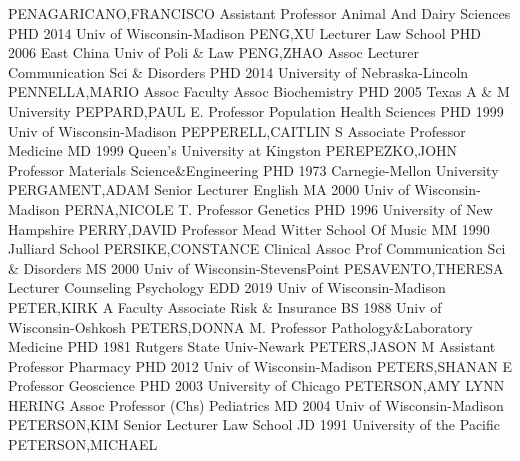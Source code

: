 \documentclass[
]{article}
\begin{document}
\textbar PENAGARICANO,FRANCISCO \textbar Assistant Professor
\textbar Animal And Dairy Sciences \textbar PHD 2014 Univ of
Wisconsin-Madison \textbar{}  \textbar PENG,XU
\textbar Lecturer \textbar Law School \textbar PHD 2006 East China Univ
of Poli \& Law \textbar{}  \textbar PENG,ZHAO \textbar Assoc
Lecturer \textbar Communication Sci \& Disorders \textbar PHD 2014
University of Nebraska-Lincoln \textbar{} 
\textbar PENNELLA,MARIO \textbar Assoc Faculty Assoc
\textbar Biochemistry \textbar PHD 2005 Texas A \& M University
\textbar{}  \textbar PEPPARD,PAUL E. \textbar Professor
\textbar Population Health Sciences \textbar PHD 1999 Univ of
Wisconsin-Madison \textbar{}  \textbar PEPPERELL,CAITLIN S
\textbar Associate Professor \textbar Medicine \textbar MD 1999 Queen's
University at Kingston \textbar{}  \textbar PEREPEZKO,JOHN
\textbar Professor \textbar Materials Science\&Engineering \textbar PHD
1973 Carnegie-Mellon University \textbar{} 
\textbar PERGAMENT,ADAM \textbar Senior Lecturer \textbar English
\textbar MA 2000 Univ of Wisconsin-Madison \textbar{} 
\textbar PERNA,NICOLE T. \textbar Professor \textbar Genetics
\textbar PHD 1996 University of New Hampshire \textbar{} 
\textbar PERRY,DAVID \textbar Professor \textbar Mead Witter School Of
Music \textbar MM 1990 Julliard School \textbar{} 
\textbar PERSIKE,CONSTANCE \textbar Clinical Assoc Prof
\textbar Communication Sci \& Disorders \textbar MS 2000 Univ of
Wisconsin-StevensPoint \textbar{} 
\textbar PESAVENTO,THERESA \textbar Lecturer \textbar Counseling
Psychology \textbar EDD 2019 Univ of Wisconsin-Madison \textbar{}
 \textbar PETER,KIRK A \textbar Faculty Associate
\textbar Risk \& Insurance \textbar BS 1988 Univ of Wisconsin-Oshkosh
\textbar{}  \textbar PETERS,DONNA M. \textbar Professor
\textbar Pathology\&Laboratory Medicine \textbar PHD 1981 Rutgers State
Univ-Newark \textbar{}  \textbar PETERS,JASON M
\textbar Assistant Professor \textbar Pharmacy \textbar PHD 2012 Univ of
Wisconsin-Madison \textbar{}  \textbar PETERS,SHANAN E
\textbar Professor \textbar Geoscience \textbar PHD 2003 University of
Chicago \textbar{}  \textbar PETERSON,AMY LYNN HERING
\textbar Assoc Professor (Chs) \textbar Pediatrics \textbar MD 2004 Univ
of Wisconsin-Madison \textbar{}  \textbar PETERSON,KIM
\textbar Senior Lecturer \textbar Law School \textbar JD 1991 University
of the Pacific \textbar{}  \textbar PETERSON,MICHAEL
\end{document}
